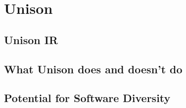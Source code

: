 \section{Unison}

\subsection{Unison IR}

\subsection{What Unison does and doesn't do}

\subsection{Potential for Software Diversity}
